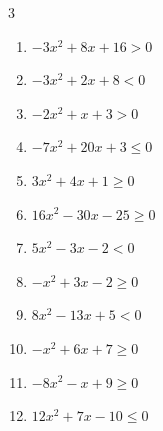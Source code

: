 \begin{multicols}{3}
\begin{enumerate}

  \item $-3x^{2}+8x+16>0$


\columnbreak %

  \item $-3x^{2}+2x+8<0$


  \item $-2x^{2}+x+3>0$


  \item $-7x^{2}+20x+3\leq 0$


  \item $3x^{2}+4x+1\geq 0$


  \item $16x^{2}-30x-25\geq 0$


  \item $5x^{2}-3x-2<0$


  \item $-x^{2}+3x-2\geq 0$

        \phantom{$\displaystyle 1 \leqq x \leqq 2$}

  \item $8x^{2}-13x+5<0$


  \item $-x^{2}+6x+7\geq 0$

        \phantom{$\displaystyle -1 \leqq x \leqq 7$}

  \item $-8x^{2}-x+9\geq 0$


\columnbreak %

\resetques

  \item $12x^{2}+7x-10\leq 0$


\end{enumerate}
\end{multicols}
